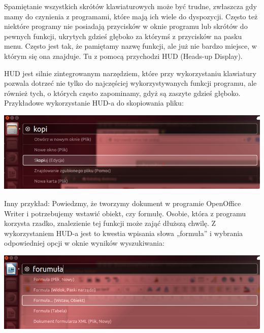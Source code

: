 Spamiętanie wszystkich skrótów klawiaturowych może być trudne, zwłaszcza gdy mamy do czynienia z programami, które mają ich wiele do dyspozycji. Często też niektóre programy nie posiadają przycisków w oknie programu lub skrótów do pewnych funkcji, ukrytych gdzieś głęboko za którymś z przycisków na pasku menu. Często jest tak, że pamiętamy nazwę funkcji, ale już nie bardzo miejsce, w którym się ona znajduje. Tu z pomocą przychodzi \textcolor{ubuntu_orange}{HUD} (Heads-up Display).

HUD jest silnie zintegrowanym narzędziem, które przy wykorzystaniu klawiatury pozwala dotrzeć nie tylko do najczęściej wykorzystywanych funkcji programu, ale również tych, o których często zapominamy, gdyż są zaszyte gdzieś głęboko. Przykładowe wykorzystanie HUD-a do skopiowania pliku:

\begin{center}
	\includegraphics[width=\linewidth]{images/unity_hud1.png}
\end{center}

Inny przykład: Powiedzmy, że tworzymy dokument w programie OpenOffice Writer i potrzebujemy wstawić obiekt, czy formułę. Osobie, która z programu korzysta rzadko, znalezienie tej funkcji może zająć dłuższą chwilę. Z wykorzystaniem HUD-a jest to kwestia wpisania słowa „formuła” i wybrania odpowiedniej opcji w oknie wyników wyszukiwania:

\begin{center}
	\includegraphics[width=\linewidth]{images/unity_hud2.png}
\end{center}
